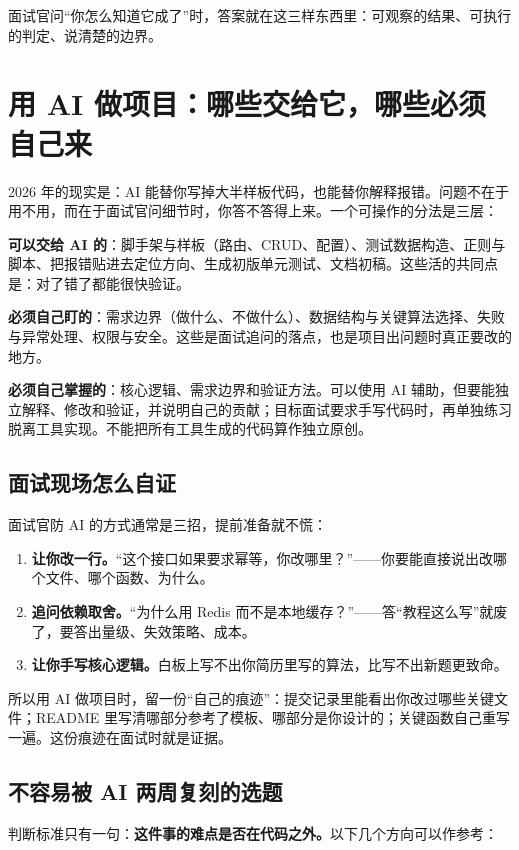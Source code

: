 \documentclass[UTF8,zihao=5,openany]{ctexbook}
\begin{document}
面试官问“你怎么知道它成了”时，答案就在这三样东西里：可观察的结果、可执行的判定、说清楚的边界。

\section{用 AI 做项目：哪些交给它，哪些必须自己来}

2026 年的现实是：AI 能替你写掉大半样板代码，也能替你解释报错。问题不在于用不用，而在于面试官问细节时，你答不答得上来。一个可操作的分法是三层：

\textbf{可以交给 AI 的}：脚手架与样板（路由、CRUD、配置）、测试数据构造、正则与脚本、把报错贴进去定位方向、生成初版单元测试、文档初稿。这些活的共同点是：对了错了都能很快验证。

\textbf{必须自己盯的}：需求边界（做什么、不做什么）、数据结构与关键算法选择、失败与异常处理、权限与安全。这些是面试追问的落点，也是项目出问题时真正要改的地方。

\textbf{必须自己掌握的}：核心逻辑、需求边界和验证方法。可以使用 AI 辅助，但要能独立解释、修改和验证，并说明自己的贡献；目标面试要求手写代码时，再单独练习脱离工具实现。不能把所有工具生成的代码算作独立原创。

\subsection{面试现场怎么自证}

面试官防 AI 的方式通常是三招，提前准备就不慌：
\begin{enumerate}
\item \textbf{让你改一行。}“这个接口如果要求幂等，你改哪里？”——你要能直接说出改哪个文件、哪个函数、为什么。
\item \textbf{追问依赖取舍。}“为什么用 Redis 而不是本地缓存？”——答“教程这么写”就废了，要答出量级、失效策略、成本。
\item \textbf{让你手写核心逻辑。}白板上写不出你简历里写的算法，比写不出新题更致命。
\end{enumerate}

所以用 AI 做项目时，留一份“自己的痕迹”：提交记录里能看出你改过哪些关键文件；README 里写清哪部分参考了模板、哪部分是你设计的；关键函数自己重写一遍。这份痕迹在面试时就是证据。

\subsection{不容易被 AI 两周复刻的选题}

判断标准只有一句：\textbf{这件事的难点是否在代码之外。}以下几个方向可以作参考：
\end{document}
